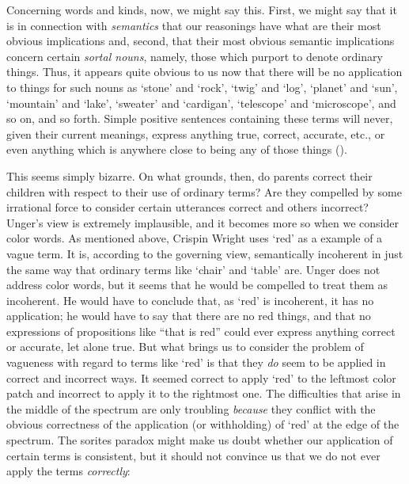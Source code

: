 \documentclass[11pt]{article}
\newenvironment{squote}{%
\begin{spacing}{1}
       	\begin{list}{}{%
\setlength{\labelwidth}{0pt}%
\rightmargin\leftmargin%
}
\item\relax
}{%
\end{list}%
\end{spacing}
}
\begin{document}
\begin{spacing}{1.5}
\begin{squote}
Concerning words and kinds, now, we might say this.  First, we might
say that it is in connection with \emph{semantics} that our reasonings have
what are their most obvious implications and, second, that their most
obvious semantic implications concern certain \emph{sortal nouns}, namely,
those which purport to denote ordinary things.  Thus, it appears quite
obvious to us now that there will be no application to things for such
nouns as `stone' and `rock', `twig' and `log', `planet' and `sun',
`mountain' and `lake', `sweater' and `cardigan', `telescope' and
`microscope', and so on, and so forth.  Simple positive sentences
containing these terms will never, given their current meanings,
express anything true, correct, accurate, etc., or even anything which
is anywhere close to being any of those things
(\citeyear[148]{unger1979}).
\end{squote}

This seems simply bizarre.  On what grounds, then, do parents correct
their children with respect to their use of ordinary terms?  Are they
compelled by some irrational force to consider certain utterances
correct and others incorrect?  Unger's view is extremely implausible,
and it becomes more so when we consider color words.  As mentioned
above, Crispin Wright uses `red' as a example of a vague term.  It is,
according to the governing view, semantically incoherent in just the
same way that ordinary terms like `chair' and `table' are.  Unger does
not address color words, but it seems that he would be compelled to
treat them as incoherent.  He would have to conclude that, as `red' is
incoherent, it has no application; he would have to say that there are
no red things, and that no expressions of propositions like ``that is
red'' could ever express anything correct or accurate, let alone true.
But what brings us to consider the problem of vagueness with regard to
terms like `red' is that they \emph{do} seem to be applied in correct
and incorrect ways.  It seemed correct to apply `red' to the leftmost
color patch and incorrect to apply it to the rightmost one.  The
difficulties that arise in the middle of the spectrum are only
troubling \emph{because} they conflict with the obvious correctness of
the application (or withholding) of `red' at the edge of the spectrum.
The sorites paradox might make us doubt whether our application of
certain terms is consistent, but it should not convince us that we do
not ever apply the terms \emph{correctly}:


\end{spacing}
\end{document}
